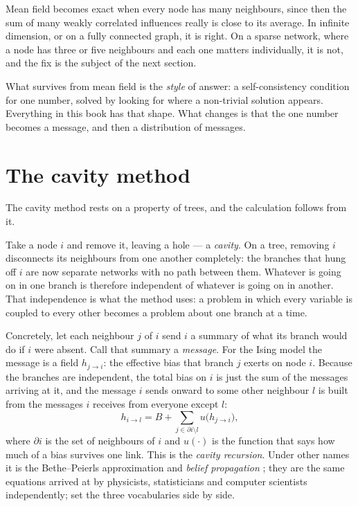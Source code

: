 Mean field becomes exact when every node has many neighbours, since then the sum
of many weakly correlated influences really is close to its average. In infinite
dimension, or on a fully connected graph, it is right. On a sparse network,
where a node has three or five neighbours and each one matters individually, it
is not, and the fix is the subject of the next section.

What survives from mean field is the \emph{style} of answer: a self-consistency
condition for one number, solved by looking for where a non-trivial solution
appears. Everything in this book has that shape. What changes is that the one
number becomes a message, and then a distribution of messages.

\section{The cavity method}
\label{sec:cavity}

The cavity method rests on a property of trees, and the calculation follows
from it.

Take a node $i$ and remove it, leaving a hole --- a \emph{cavity}. On a tree,
removing $i$ disconnects its neighbours from one another completely: the
branches that hung off $i$ are now separate networks with no path between them.
Whatever is going on in one branch is therefore independent of whatever is going
on in another. That independence is what the method uses: a problem in which
every variable is coupled to every other becomes a problem about one branch at
a time.

Concretely, let each neighbour $j$ of $i$ send $i$ a summary of what its branch
would do if $i$ were absent. Call that summary a \emph{message}. For the Ising
model the message is a field $h_{j\to i}$: the effective bias that branch $j$
exerts on node $i$. Because the branches are independent, the total bias on $i$
is just the sum of the messages arriving at it, and the message $i$ sends onward
to some other neighbour $l$ is built from the messages $i$ receives from
everyone except $l$:
\begin{equation}
  h_{i\to l}=B+\sum_{j\in\partial i\setminus l}
             u\bigl(h_{j\to i}\bigr),
  \label{eq:cavity-intro}
\end{equation}
where $\partial i$ is the set of neighbours of $i$ and $u(\cdot)$ is the
function that says how much of a bias survives one link. This is the
\emph{cavity recursion}. Under other names it is the Bethe--Peierls
approximation \citep{bethe1935} and \emph{belief propagation}
\citep{yedidia2005}; they are the same equations arrived at by physicists,
statisticians and computer scientists independently; \citet{mezard2009} set the
three vocabularies side by side.

